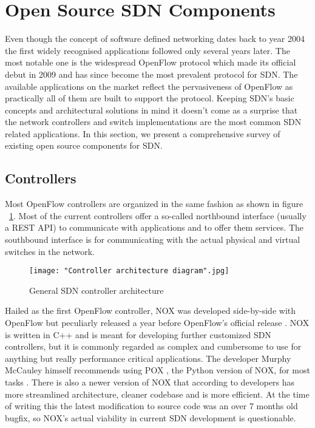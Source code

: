 \section{Open Source SDN Components}

Even though the concept of software defined networking dates back to year 2004 \cite{robert2012system} the first widely recognised applications followed only several years later. The most notable one is the widespread OpenFlow protocol \cite{OpenFlow1.0.0} which made its official debut in 2009 and has since become the most prevalent protocol for SDN. The available applications on the market reflect the pervasiveness of OpenFlow as practically all of them are built to support the protocol. Keeping SDN’s basic concepts and architectural solutions in mind it doesn’t come as a surprise that the network controllers and switch implementations are the most common SDN related applications. In this section, we present a comprehensive survey of existing open source components for SDN.

\subsection{Controllers}

Most OpenFlow controllers are organized in the same fashion as shown in figure ~\ref{fig:architecture}. Most of the current controllers offer a so-called northbound interface (usually a REST API) to communicate with applications and to offer them services. The southbound interface is for communicating with the actual physical and virtual switches in the network.

\begin{figure}[ht!]
\centering
{}
\texttt{[image: "Controller architecture diagram".jpg]}
\caption{General SDN controller architecture}
\label{fig:architecture}
\end{figure}

	Hailed as the first OpenFlow controller, NOX was developed side-by-side with OpenFlow but peculiarly released a year before OpenFlow’s official release \cite{NOX}. NOX is written in C++ and is meant for developing further customized SDN controllers, but it is commonly regarded as complex and cumbersome to use for anything but really performance critical applications. The developer Murphy McCauley himself recommends using POX \cite{POX}, the Python version of NOX, for most tasks \cite{CHU12}. There is also a newer version of NOX that according to developers has more streamlined architecture, cleaner codebase and is more efficient. At the time of writing this the latest modification to source code was an over 7 months old bugfix, so NOX’s actual viability in current SDN development is questionable.

